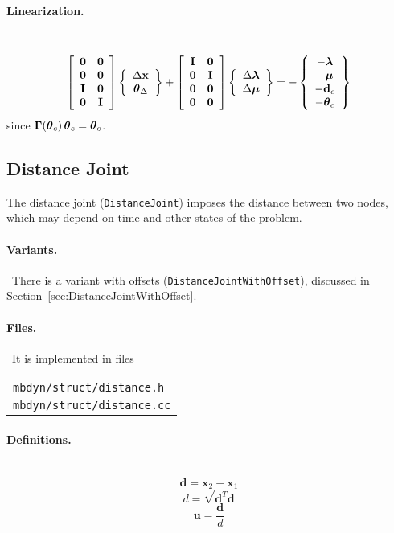 \documentclass[10pt,dvips,fleqn,subeqn]{report}
\newcommand{\T}[1]{\bm{\mathbf{#1}}}
\newcommand{\TT}[1]{\bm{\mathbf{#1}}}
\begin{document}
\paragraph{Linearization.} \
\begin{equation}
	\sqbr{\matr{cc}{
	\TT{0} & \TT{0} \\
	\TT{0} & \TT{0} \\
	\TT{I} & \TT{0} \\
	\TT{0} & \TT{I}
	}} \cubr{\cvvect{
		\Delta\T{x} \\
		\T{\theta}_{\Delta}
	}}
	+ \sqbr{\matr{cc}{
		\TT{I} & \TT{0} \\
		\TT{0} & \TT{I} \\
		\TT{0} & \TT{0} \\
		\TT{0} & \TT{0}
	}} \cubr{\cvvect{
		\Delta\T{\lambda} \\
		\Delta\T{\mu}
	}}
	= - \cubr{\cvvect{
		- \T{\lambda} \\
		- \T{\mu} \\
		- \T{d}_c \\
		- \T{\theta}_c
	}}
\end{equation}
since $\TT{\Gamma}\!\plbr{\T{\theta}_c} \T{\theta}_c = \T{\theta}_c$.




\subsection{Distance Joint}
\label{sec:DistanceJoint}
The distance joint (\texttt{DistanceJoint}) imposes the distance between two nodes,
which may depend on time and other states of the problem.

\paragraph{Variants.} \
There is a variant with offsets (\texttt{DistanceJointWithOffset}),
discussed in Section~\ref{sec:DistanceJointWithOffset}.

\paragraph{Files.} \
It is implemented in files

\begin{tabular}{l}
\texttt{mbdyn/struct/distance.h} \\
\texttt{mbdyn/struct/distance.cc}
\end{tabular}

\paragraph{Definitions.} \
\begin{equation}
	\T{d} = \T{x}_2 - \T{x}_1
\end{equation}
\begin{equation}
	d = \sqrt{\T{d}^T \T{d}}
\end{equation}
\begin{equation}
	\T{u} = \frac{\T{d}}{d}
\end{equation}
\end{document}
